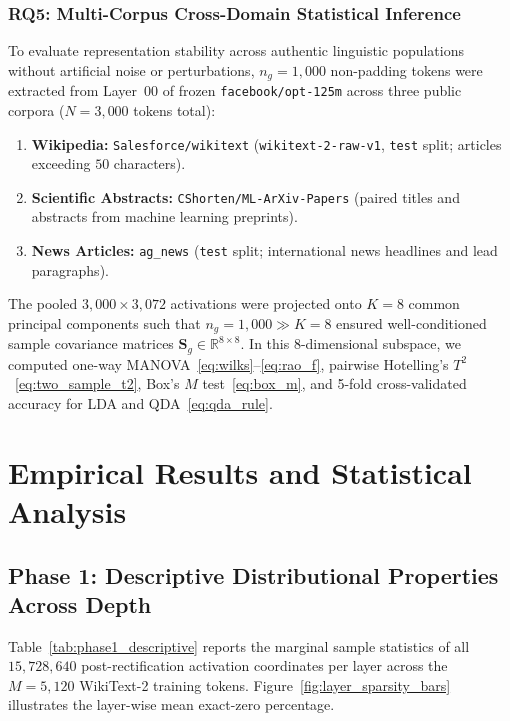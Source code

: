 \documentclass[12pt, a4paper, oneside]{report}
\theoremstyle{definition}
\newcommand{\mat}[1]{\mathbf{#1}}
\newcommand{\R}{\mathbb{R}}
\begin{document}
\subsection{RQ5: Multi-Corpus Cross-Domain Statistical Inference}

To evaluate representation stability across authentic linguistic populations without artificial noise or perturbations, $n_g = 1{,}000$ non-padding tokens were extracted from Layer~00 of frozen \texttt{facebook/opt-125m} across three public corpora ($N = 3{,}000$ tokens total):
\begin{enumerate}
    \item \textbf{Wikipedia:} \texttt{Salesforce/wikitext} (\texttt{wikitext-2-raw-v1}, \texttt{test} split; articles exceeding $50$ characters).
    \item \textbf{Scientific Abstracts:} \texttt{CShorten/ML-ArXiv-Papers} (paired titles and abstracts from machine learning preprints).
    \item \textbf{News Articles:} \texttt{ag\_news} (\texttt{test} split; international news headlines and lead paragraphs).
\end{enumerate}
The pooled $3{,}000 \times 3{,}072$ activations were projected onto $K = 8$ common principal components such that $n_g = 1{,}000 \gg K = 8$ ensured well-conditioned sample covariance matrices $\mat{S}_g \in \R^{8 \times 8}$. In this $8$-dimensional subspace, we computed one-way MANOVA~\eqref{eq:wilks}--\eqref{eq:rao_f}, pairwise Hotelling's $T^2$~\eqref{eq:two_sample_t2}, Box's $M$ test~\eqref{eq:box_m}, and 5-fold cross-validated accuracy for LDA and QDA~\eqref{eq:qda_rule}.

\chapter{Empirical Results and Statistical Analysis}

\section{Phase 1: Descriptive Distributional Properties Across Depth}

Table~\ref{tab:phase1_descriptive} reports the marginal sample statistics of all $15{,}728{,}640$ post-rectification activation coordinates per layer across the $M = 5{,}120$ WikiText-2 training tokens. Figure~\ref{fig:layer_sparsity_bars} illustrates the layer-wise mean exact-zero percentage.
\end{document}
